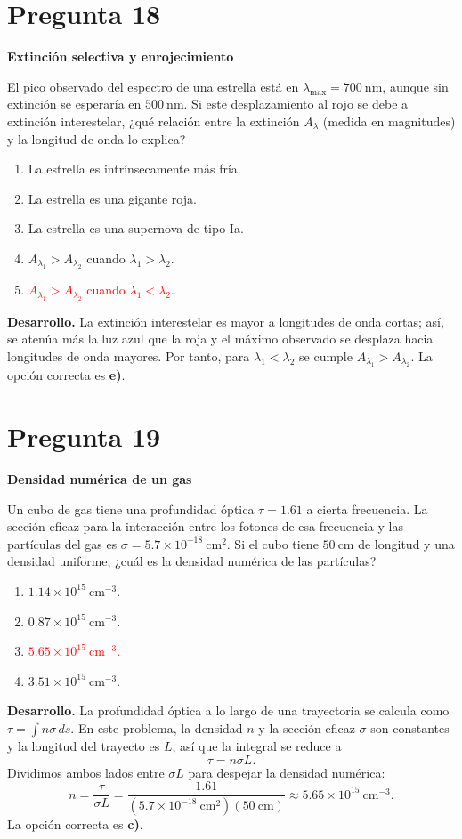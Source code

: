 \documentclass[a4paper,11pt]{article}
\newcommand{\pregunta}[2]{\section*{Pregunta #1}\textbf{#2}\par}
\begin{document}
\pregunta{18}{Extinción selectiva y enrojecimiento}

El pico observado del espectro de una estrella está en $\lambda_{\max}=700\ \mathrm{nm}$, aunque sin extinción se esperaría en $500\ \mathrm{nm}$. Si este desplazamiento al rojo se debe a extinción interestelar, ¿qué relación entre la extinción $A_\lambda$ (medida en magnitudes) y la longitud de onda lo explica?

\begin{enumerate}
    \item La estrella es intrínsecamente más fría.
    \item La estrella es una gigante roja.
    \item La estrella es una supernova de tipo Ia.
    \item $A_{\lambda_1}>A_{\lambda_2}$ cuando $\lambda_1>\lambda_2$.
    \item \textcolor{red}{$A_{\lambda_1}>A_{\lambda_2}$ cuando $\lambda_1<\lambda_2$.}
\end{enumerate}

\textbf{Desarrollo.} La extinción interestelar es mayor a longitudes de onda cortas; así, se atenúa más la luz azul que la roja y el máximo observado se desplaza hacia longitudes de onda mayores. Por tanto, para $\lambda_1<\lambda_2$ se cumple $A_{\lambda_1}>A_{\lambda_2}$. La opción correcta es \textbf{e)}. \parencite[Sec. 12.3.1, pp. 383--385]{chaparro2026}

\pregunta{19}{Densidad numérica de un gas}

Un cubo de gas tiene una profundidad óptica $\tau=1.61$ a cierta frecuencia. La sección eficaz para la interacción entre los fotones de esa frecuencia y las partículas del gas es $\sigma=5.7\times10^{-18}\ \mathrm{cm^2}$. Si el cubo tiene $50\ \mathrm{cm}$ de longitud y una densidad uniforme, ¿cuál es la densidad numérica de las partículas?

\begin{enumerate}
    \item $1.14\times10^{15}\ \mathrm{cm^{-3}}$.
    \item $0.87\times10^{15}\ \mathrm{cm^{-3}}$.
    \item \textcolor{red}{$5.65\times10^{15}\ \mathrm{cm^{-3}}$.}
    \item $3.51\times10^{15}\ \mathrm{cm^{-3}}$.
\end{enumerate}



\textbf{Desarrollo.} La profundidad óptica a lo largo de una trayectoria se calcula como $\tau=\int n\sigma\,ds$. En este problema, la densidad $n$ y la sección eficaz $\sigma$ son constantes y la longitud del trayecto es $L$, así que la integral se reduce a
\[
\tau=n\sigma L.
\]
Dividimos ambos lados entre $\sigma L$ para despejar la densidad numérica:
\[
n=\frac{\tau}{\sigma L}
=\frac{1.61}{(5.7\times10^{-18}\ \mathrm{cm^2})(50\ \mathrm{cm})}
\approx5.65\times10^{15}\ \mathrm{cm^{-3}}.
\]
La opción correcta es \textbf{c)}. \parencite[Sec. 13.3.1, pp. 394--395]{chaparro2026}
\end{document}
